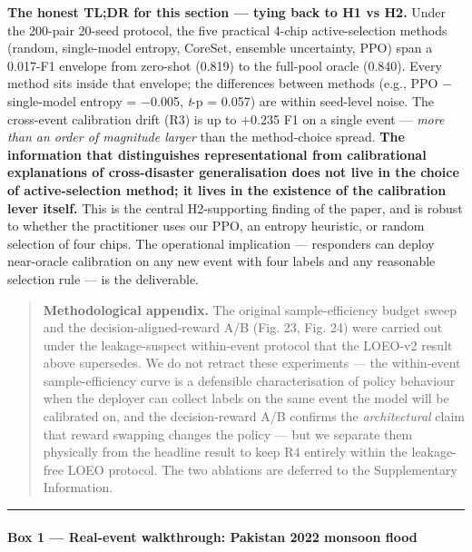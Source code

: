 \textbf{The honest TL;DR for this section --- tying back to H1 vs H2.} Under
the 200-pair 20-seed protocol, the five practical 4-chip
active-selection methods (random, single-model entropy, CoreSet,
ensemble uncertainty, PPO) span a 0.017-F1 envelope from zero-shot
(0.819) to the full-pool oracle (0.840). Every method sits inside that
envelope; the differences between methods (e.g., PPO − single-model
entropy = −0.005, \emph{t}-p = 0.057) are within seed-level noise. The
cross-event calibration drift (R3) is up to +0.235 F1 on a single
event --- \emph{more than an order of magnitude larger} than the method-choice
spread. \textbf{The information that distinguishes representational from
calibrational explanations of cross-disaster generalisation does not
live in the choice of active-selection method; it lives in the
existence of the calibration lever itself.} This is the central
H2-supporting finding of the paper, and is robust to whether the
practitioner uses our PPO, an entropy heuristic, or random selection
of four chips. The operational implication --- responders can deploy
near-oracle calibration on any new event with four labels and any
reasonable selection rule --- is the deliverable.

\begin{quote}
\textbf{Methodological appendix.} The original sample-efficiency budget sweep
and the decision-aligned-reward A/B (Fig. 23, Fig. 24) were carried out
under the leakage-suspect within-event protocol that the LOEO-v2 result
above supersedes. We do not retract these experiments --- the within-event
sample-efficiency curve is a defensible characterisation of policy
behaviour when the deployer can collect labels on the same event the
model will be calibrated on, and the decision-reward A/B confirms the
\emph{architectural} claim that reward swapping changes the policy --- but we
separate them physically from the headline result to keep R4 entirely
within the leakage-free LOEO protocol. The two ablations are deferred to
the Supplementary Information.
\end{quote}

\begin{center}\rule{0.5\linewidth}{0.5pt}\end{center}

\paragraph{Box 1 --- Real-event walkthrough: Pakistan 2022 monsoon flood}\label{box-1-real-event-walkthrough-pakistan-2022-monsoon-flood}


